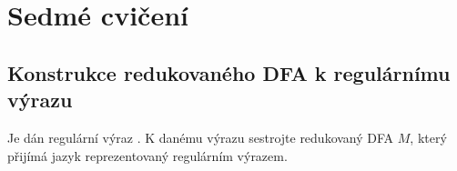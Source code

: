 \section{Sedmé cvičení}


\subsection{Konstrukce redukovaného DFA k regulárnímu výrazu}
Je dán regulární výraz . K danému výrazu sestrojte redukovaný DFA $M$,
který přijímá jazyk reprezentovaný regulárním výrazem.

